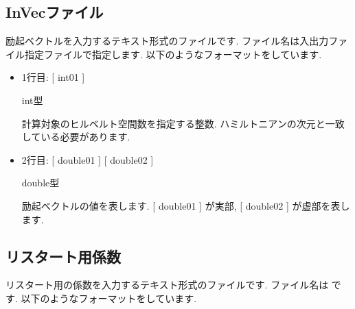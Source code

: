 \documentclass[letterpaper,10pt,dvipdfmx,openany]{sphinxmanual}
\begin{document}
\subsection{InVecファイル}
\label{\detokenize{shiftk_format_ja:invec}}\label{\detokenize{shiftk_format_ja:vec}}
励起ベクトルを入力するテキスト形式のファイルです.
ファイル名は入出力ファイル指定ファイルで指定します.
以下のようなフォーマットをしています.

\begin{sphinxVerbatim}[commandchars=\\\{\}]
 
 
\end{sphinxVerbatim}
\begin{itemize}
\item {} 
1行目: {[} int01 {]}

 int型

 計算対象のヒルベルト空間数を指定する整数.
ハミルトニアンの次元と一致している必要があります.

\item {} 
2行目\sphinxhyphen{}:
{[} double01 {]} {[} double02 {]}

 double型

 励起ベクトルの値を表します.
{[} double01 {]} が実部, {[} double02 {]} が虚部を表します.

\end{itemize}


\subsection{リスタート用係数}
\label{\detokenize{shiftk_format_ja:recoeff}}\label{\detokenize{shiftk_format_ja:id4}}
リスタート用の係数を入力するテキスト形式のファイルです.
ファイル名は  です.
以下のようなフォーマットをしています.
\end{document}

